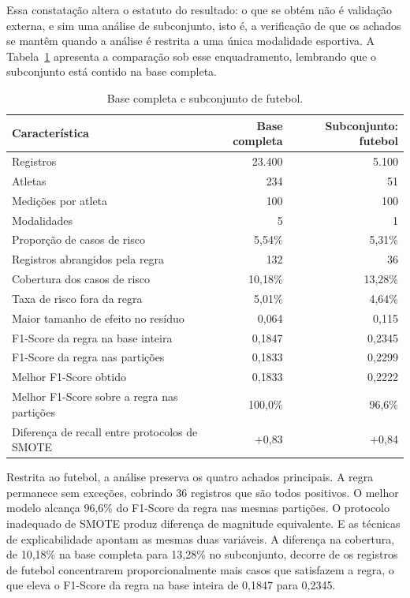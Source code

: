Essa constatação altera o estatuto do resultado: o que se obtém não é validação externa, e sim uma análise de subconjunto, isto é, a verificação de que os achados se mantêm quando a análise é restrita a uma única modalidade esportiva. A Tabela~\ref{tab:comparativo} apresenta a comparação sob esse enquadramento, lembrando que o subconjunto está contido na base completa.

\begin{table}[H]
\centering
\caption{Base completa e subconjunto de futebol.}
\label{tab:comparativo}
\begin{tabular}{lrr}
\toprule
Característica & Base completa & Subconjunto: futebol \\
\midrule
Registros                     & 23.400 & 5.100 \\
Atletas                       & 234    & 51 \\
Medições por atleta           & 100    & 100 \\
Modalidades                   & 5      & 1 \\
Proporção de casos de risco   & 5{,}54\% & 5{,}31\% \\
Registros abrangidos pela regra & 132  & 36 \\
Cobertura dos casos de risco  & 10{,}18\% & 13{,}28\% \\
Taxa de risco fora da regra & 5{,}01\% & 4{,}64\% \\
Maior tamanho de efeito no resíduo & 0{,}064 & 0{,}115 \\
F1-Score da regra na base inteira & 0{,}1847 & 0{,}2345 \\
F1-Score da regra nas partições & 0{,}1833 & 0{,}2299 \\
Melhor F1-Score obtido        & 0{,}1833 & 0{,}2222 \\
Melhor F1-Score sobre a regra nas partições & 100{,}0\% & 96{,}6\% \\
Diferença de recall entre protocolos de SMOTE & $+$0{,}83 & $+$0{,}84 \\
\bottomrule
\end{tabular}
\end{table}

Restrita ao futebol, a análise preserva os quatro achados principais. A regra permanece sem exceções, cobrindo 36 registros que são todos positivos. O melhor modelo alcança 96{,}6\% do F1-Score da regra nas mesmas partições. O protocolo inadequado de SMOTE produz diferença de magnitude equivalente. E as técnicas de explicabilidade apontam as mesmas duas variáveis. A diferença na cobertura, de 10{,}18\% na base completa para 13{,}28\% no subconjunto, decorre de os registros de futebol concentrarem proporcionalmente mais casos que satisfazem a regra, o que eleva o F1-Score da regra na base inteira de 0{,}1847 para 0{,}2345.

